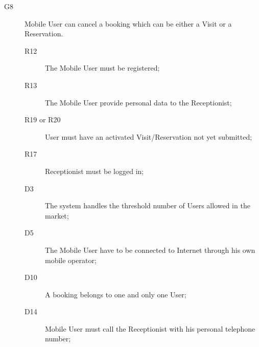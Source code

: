 \begin{description}
    \item[G8]Mobile User can cancel a booking which can be either a Visit or a Reservation.
    \begin{description}
    \item[R12] The Mobile User must be registered; %
    \item[R13] The Mobile User provide personal data to the Receptionist; %
    \item[R19 or R20] User must have an activated Visit/Reservation not yet submitted;
    \item[R17] Receptionist must be logged in;
    \item[D3] The system handles the threshold number of Users allowed in the market;
    \item[D5] The Mobile User have to be connected to Internet through his own mobile operator;
    \item[D10] A booking belongs to one and only one User;
    \item[D14] Mobile User must call the Receptionist with his personal telephone number;
    \end{description}
    
    
\end{description}

